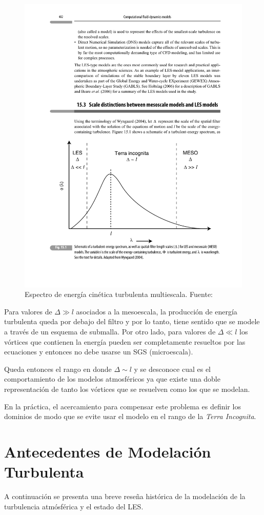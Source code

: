 \begin{figure}[H]
	\centering
	\includegraphics[width=0.69\linewidth,trim={2cm 3.0cm 1.5cm 11.5cm},clip]{Imagenes/02/terra_inc}
	\caption{Espectro de energía cinética turbulenta multiescala. Fuente: \cite{warner2010numerical}}
	\label{fig:02_terra_inc}
\end{figure}

Para valores de $\Delta\gg l$ asociados a la mesoescala, la producción de energía turbulenta queda por debajo del filtro y por lo tanto, tiene sentido que se modele a través de un esquema de submalla. Por otro lado, para valores de $\Delta\ll l$ los vórtices que contienen la energía pueden ser completamente resueltos por las ecuaciones y entonces no debe usarse un SGS (microescala).

Queda entonces el rango en donde $\Delta\sim l$ y se desconoce cual es el comportamiento de los modelos atmosféricos ya que existe una doble representación de tanto los vórtices que se resuelven como los que se modelan.

En la práctica, el acercamiento para compensar este problema es definir los dominios de modo que se evite usar el modelo en el rango de la \emph{Terra Incognita}.

\newpage
\section{Antecedentes de Modelación Turbulenta}
A continuación se presenta una breve reseña histórica de la modelación de la turbulencia atmósférica y el estado del LES.

